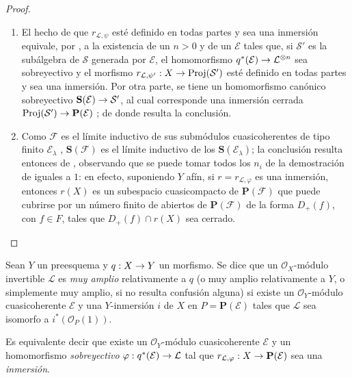 \documentclass[oneside,10pt]{amsart}
\makeatletter
\newcommand{\ega@arrow}[2]{\mathchoice{#1}{#2}{#2}{#2}}
\renewcommand{\to}{\ega@arrow{\longrightarrow}{\rightarrow}}
\let\EGAOriginalLabel\label
\renewcommand{\label}[1]{\phantomsection\EGAOriginalLabel{#1}}
\makeatother
\begin{document}
\begin{proof}
\medskip\noindent
\begin{enumerate}
  \item[\rm{(i)}] El hecho de que $r_{\mathcal{L},\psi}$ esté definido en todas partes y sea una inmersión equivale, por , a la existencia de un $n>0$ y de un $\mathcal{E}$ tales que, si $\mathcal{S}'$ es la subálgebra de $\mathcal{S}$ generada por $\mathcal{E}$, el homomorfismo $q^*(\mathcal{E})\to\mathcal{L}^{\otimes n}$ sea sobreyectivo y el morfismo $r_{\mathcal{L},\psi'}:X\to\operatorname{Proj}(\mathcal{S}')$ esté definido en todas partes y sea una inmersión.
    Por otra parte, se tiene un homomorfismo canónico sobreyectivo $\mathbf{S}(\mathcal{E})\to\mathcal{S}'$, al cual corresponde una inmersión cerrada $\operatorname{Proj}(\mathcal{S}')\to\mathbf{P}(\mathcal{E})$ ;
    de donde resulta la conclusión.
  \item[\rm{(ii)}] Como $\mathcal{F}$ es el límite inductivo de sus submódulos cuasicoherentes de tipo finito $\mathcal{E}_\lambda$ , $\mathbf{S}(\mathcal{F})$ es el límite inductivo de los $\mathbf{S}(\mathcal{E}_\lambda)$;
    la conclusión resulta entonces de , observando que se puede tomar todos los $n_i$ de la demostración de  iguales a $1$:
    en efecto, suponiendo $Y$ afín, si $r=r_{\mathcal{L},\varphi}$ es una inmersión, entonces $r(X)$ es un subespacio cuasicompacto de $\mathbf{P}(\mathcal{F})$ que puede cubrirse por un número finito de abiertos de $\mathbf{P}(\mathcal{F})$ de la forma $D_+(f)$, con $f\in F$, tales que $D_+(f)\cap r(X)$ sea cerrado.
\end{enumerate}
\end{proof}

\begin{definition}[4.4.2]
\label{II.4.4.2-fr}
Sean $Y$ un preesquema y $q:X\to Y$ un morfismo.
Se dice que un $\mathcal{O}_X$-módulo invertible $\mathcal{L}$ es \emph{muy amplio} relativamente a $q$ \textup{(o} muy amplio relativamente a $Y$\textup{, o simplemente} muy amplio\textup{, si no resulta confusión alguna)} si existe un $\mathcal{O}_Y$-módulo cuasicoherente $\mathcal{E}$ y una $Y$-inmersión $i$ de $X$ en $P=\mathbf{P}(\mathcal{E})$ tales que $\mathcal{L}$ sea isomorfo a $i^*(\mathcal{O}_P(1))$.
\end{definition}

Es equivalente  decir que existe un $\mathcal{O}_Y$-módulo cuasicoherente $\mathcal{E}$ y un homomorfismo \emph{sobreyectivo} $\varphi:q^*(\mathcal{E})\to\mathcal{L}$ tal que $r_{\mathcal{L},\varphi}:X\to\mathbf{P}(\mathcal{E})$ sea una \emph{inmersión}.
\end{document}
